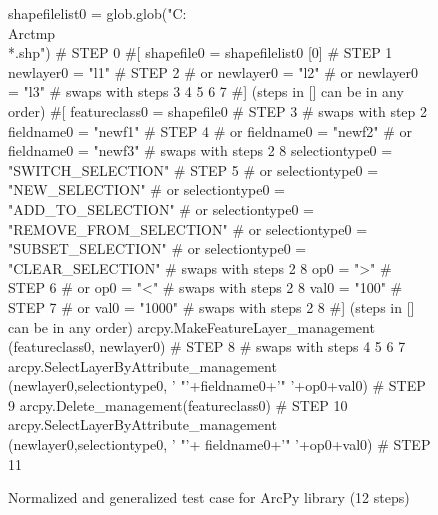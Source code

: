 \begin{figure}
{\scriptsize 
\begin{code}
shapefilelist0 = 
   glob.glob("C:\\Arctmp\\*.shp")        \textcolor{black!45}{\# STEP 0}
\textcolor{black!45}{\#[}
shapefile0 = shapefilelist0 [0]        \textcolor{black!45}{\# STEP 1}
newlayer0 = "l1"                       \textcolor{black!45}{\# STEP 2}
\textcolor{black!45}{\#  or newlayer0 = "l2" }
\textcolor{black!45}{\#  or newlayer0 = "l3" }
\textcolor{black!45}{\#  swaps with steps 3 4 5 6 7}
\textcolor{black!45}{\#] (steps in [] can be in any order)}
\textcolor{black!45}{\#[}
featureclass0 = shapefile0             \textcolor{black!45}{\# STEP 3}
\textcolor{black!45}{\#  swaps with step 2}
fieldname0 = "newf1"                   \textcolor{black!45}{\# STEP 4}
\textcolor{black!45}{\#  or fieldname0 = "newf2" }
\textcolor{black!45}{\#  or fieldname0 = "newf3" }
\textcolor{black!45}{\#  swaps with steps 2 8}
selectiontype0 = "SWITCH\_SELECTION"    \textcolor{black!45}{\# STEP 5}
\textcolor{black!45}{\#  or selectiontype0 = "NEW\_SELECTION" }
\textcolor{black!45}{\#  or selectiontype0 = "ADD\_TO\_SELECTION" }
\textcolor{black!45}{\#  or selectiontype0 = "REMOVE\_FROM\_SELECTION"}
\textcolor{black!45}{\#  or selectiontype0 = "SUBSET\_SELECTION"}
\textcolor{black!45}{\#  or selectiontype0 = "CLEAR\_SELECTION"   }
\textcolor{black!45}{\#  swaps with steps 2 8}
op0 = ">"                              \textcolor{black!45}{\# STEP 6}
\textcolor{black!45}{\#  or op0 = "<" }
\textcolor{black!45}{\#  swaps with steps 2 8}
val0 = "100"                           \textcolor{black!45}{\# STEP 7}
\textcolor{black!45}{\#  or val0 = "1000" }
\textcolor{black!45}{\#  swaps with steps 2 8}
\textcolor{black!45}{\#] (steps in [] can be in any order)}
arcpy.MakeFeatureLayer\_management
   (featureclass0, newlayer0)          \textcolor{black!45}{\# STEP 8}
\textcolor{black!45}{\#  swaps with steps 4 5 6 7}
arcpy.SelectLayerByAttribute\_management
   (newlayer0,selectiontype0,
   ' "'+fieldname0+'" '+op0+val0)      \textcolor{black!45}{\# STEP 9}
arcpy.Delete\_management(featureclass0) \textcolor{black!45}{\# STEP 10}
arcpy.SelectLayerByAttribute\_management
   (newlayer0,selectiontype0,
   ' "'+ fieldname0+'" '+op0+val0)     \textcolor{black!45}{\# STEP 11}
\end{code}
}
\caption{Normalized and generalized test case for ArcPy library
  (12 steps)}
\label{esrinormgen}
\end{figure}